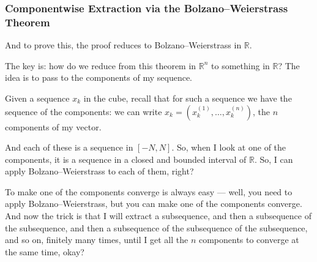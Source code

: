 \begin{proofWrapper}
\begin{content}
\begin{center}
\end{center}
\end{content}

\subsubsection{Componentwise Extraction via the Bolzano--Weierstrass Theorem}

\begin{speech}[00:54:20 - 00:56:36]
And to prove this, the proof reduces to Bolzano--Weierstrass in $\mathbb{R}$. 

The key is: how do we reduce from this theorem in $\mathbb{R}^n$ to something in $\mathbb{R}$? The idea is to pass to the components of my sequence.

Given a sequence $x_k$ in the cube,  recall that for such a sequence we have the sequence of the components: we can write $x_k = (x_k^{(1)}, \dots, x_k^{(n)})$,  the $n$ components of my vector.

And each of these is a sequence in $[-N, N]$. So, when I look at one of the components, it is a sequence in a closed and bounded interval of $\mathbb{R}$. So, I can apply Bolzano--Weierstrass to each of them, right?

To make one of the components converge is always easy --- well, you need to apply Bolzano--Weierstrass, but you can make one of the components converge. And now the trick is that I will extract a subsequence, and then a subsequence of the subsequence, and then a subsequence of the subsequence of the subsequence, and so on, finitely many times, until I get all the $n$ components to converge at the same time, okay?


\end{speech}
\end{proofWrapper}

